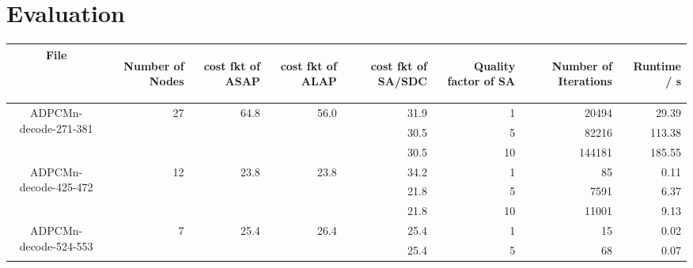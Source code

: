 \documentclass[colorback,accentcolor=tud1c,11pt]{tudreport}
\begin{document}
  \chapter{Evaluation}
  \vspace{100pt}
  \begin{tabular}{ c | r | r | r | r | r | r | r }
    File &
    \begin{rotate}{60} Number of Nodes \end{rotate} \hspace{3pt} &
    \begin{rotate}{60} cost fkt of ASAP \end{rotate} \hspace{10pt} &
    \begin{rotate}{60} cost fkt of ALAP \end{rotate} \hspace{10pt} &
    \begin{rotate}{60} cost fkt of SA/SDC \end{rotate} \hspace{10pt} &
    \begin{rotate}{60} Quality factor of SA \end{rotate} \hspace{3pt} &
    \begin{rotate}{60} Number of Iterations \end{rotate} \hspace{12pt} &
    \begin{rotate}{60} Runtime / s \end{rotate} \hspace{12pt} \\
   \hline
   \multirow{3}{*}{ADPCMn-decode-271-381} & \multirow{3}{*}{27} & \multirow{3}{*}{64.8} & \multirow{3}{*}{56.0} & 31.9 & 1 & 20494 & 29.39 \\
    &  &  &  & 30.5 & 5 & 82216 & 113.38 \\
    &  &  &  & 30.5 & 10 & 144181 & 185.55 \\
   \multirow{3}{*}{ADPCMn-decode-425-472} & \multirow{3}{*}{12} & \multirow{3}{*}{23.8} & \multirow{3}{*}{23.8} & 34.2 & 1 & 85 & 0.11 \\
    &  &  &  & 21.8 & 5 & 7591 & 6.37 \\
    &  &  &  & 21.8 & 10 & 11001 & 9.13 \\
   \multirow{3}{*}{ADPCMn-decode-524-553} & \multirow{3}{*}{7} & \multirow{3}{*}{25.4} & \multirow{3}{*}{26.4} & 25.4 & 1 & 15 & 0.02 \\
    &  &  &  & 25.4 & 5 & 68 & 0.07 \\

\end{tabular}
\end{document}
